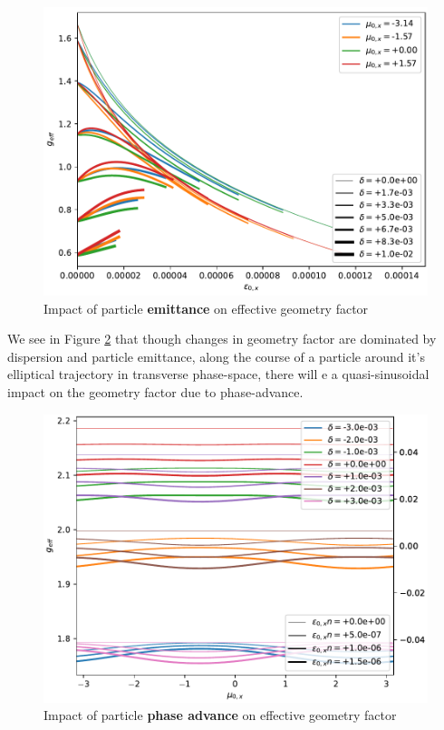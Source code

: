 \begin{figure}
    \centering
    \includegraphics{figs/g_emittance.pdf}
    \caption{Impact of particle \textbf{emittance} on effective geometry factor}
    \label{fig:g_emittance}
\end{figure}

We see in Figure \ref{fig:g_phase_advance} that though changes in geometry factor are dominated by dispersion and particle emittance, along the course of a particle around it's elliptical trajectory in transverse phase-space, there will e a quasi-sinusoidal impact on the geometry factor due to phase-advance.

\begin{figure}
    \centering
    \includegraphics{figs/g_phase_advance.pdf}
    \caption{Impact of particle \textbf{phase advance} on effective geometry factor}
    \label{fig:g_phase_advance}
\end{figure}


